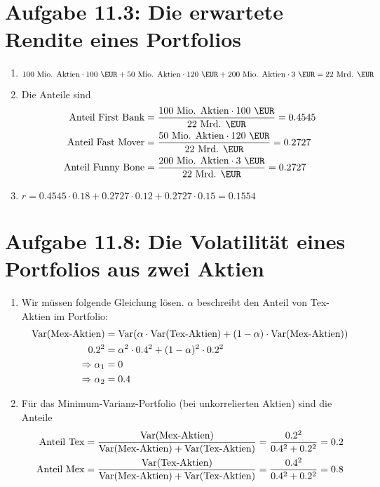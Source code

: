 \documentclass{article}
\DeclareMathOperator{\Var}{Var}
\begin{document}
	\section*{Aufgabe 11.3: Die erwartete Rendite eines Portfolios}
	\begin{enumerate}[label=(\alph*)]
		\item $100\text{ Mio. Aktien}\cdot 100\text{ \EUR} + 50\text{ Mio. Aktien}\cdot 120\text{ \EUR} + 200\text{ Mio. Aktien} \cdot 3\text{ \EUR} = 22\text{ Mrd. \EUR}$
		\item Die Anteile sind
		\begin{align}
			\text{Anteil First Bank} &= \frac{100\text{ Mio. Aktien}\cdot 100\text{ \EUR}}{22\text{ Mrd. \EUR}} = 0.4545 \notag \\
			\text{Anteil Fast Mover} &= \frac{50\text{ Mio. Aktien}\cdot 120\text{ \EUR}}{22\text{ Mrd. \EUR}} = 0.2727 \notag \\
			\text{Anteil Funny Bone} &= \frac{200\text{ Mio. Aktien}\cdot 3\text{ \EUR}}{22\text{ Mrd. \EUR}} = 0.2727 \notag
		\end{align}
		\item $r=0.4545\cdot 0.18 + 0.2727\cdot 0.12 + 0.2727\cdot 0.15=0.1554$
	\end{enumerate}

	\section*{Aufgabe 11.8: Die Volatilität eines Portfolios aus zwei Aktien}
	\begin{enumerate}[label=(\alph*)]
		\item Wir müssen folgende Gleichung lösen. $\alpha$ beschreibt den Anteil von Tex-Aktien im Portfolio:
		\begin{align}
			\Var(\text{Mex-Aktien}) &= \Var(\alpha\cdot\Var(\text{Tex-Aktien}) + (1-\alpha)\cdot\Var(\text{Mex-Aktien})) \notag \\
			0.2^2 &= \alpha^2\cdot 0.4^2 + (1-\alpha)^2\cdot 0.2^2 \notag \\
			\Rightarrow \alpha_1 &= 0 \notag \\
			\Rightarrow \alpha_2 &= 0.4 \notag
		\end{align}
		\item Für das Minimum-Varianz-Portfolio (bei unkorrelierten Aktien) sind die Anteile
		\begin{align}
			\text{Anteil Tex} &= \frac{\Var(\text{Mex-Aktien})}{\Var(\text{Mex-Aktien}) + \Var(\text{Tex-Aktien})} = \frac{0.2^2}{0.4^2 + 0.2^2} = 0.2 \notag \\
			\text{Anteil Mex} &= \frac{\Var(\text{Tex-Aktien})}{\Var(\text{Mex-Aktien}) + \Var(\text{Tex-Aktien})} = \frac{0.4^2}{0.4^2 + 0.2^2} = 0.8 \notag
		\end{align}
	\end{enumerate}
\end{document}
